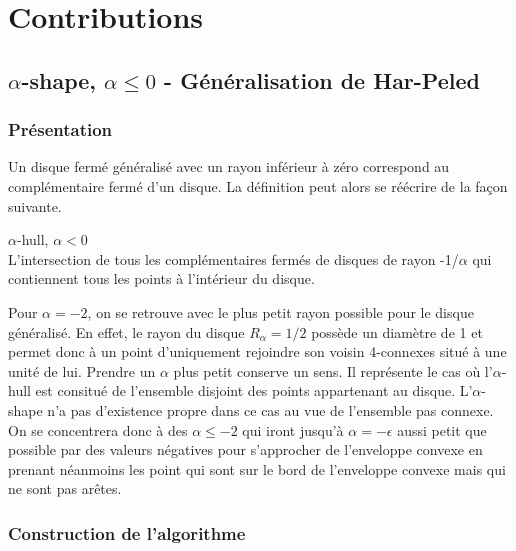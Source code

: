 \section{Contributions}

\subsection{$\alpha$-shape, $\alpha \leq 0$ - Généralisation de Har-Peled}

\subsubsection{Présentation}

Un disque fermé généralisé avec un rayon inférieur à zéro correspond au complémentaire fermé d'un disque. La définition peut alors se réécrire de la façon suivante.
\begin{Definition}{$\alpha$-hull, $\alpha < 0$}\\
\label{def:nas}
    L'intersection de tous les complémentaires fermés de disques de rayon -1/$\alpha$ qui contiennent tous les points à l’intérieur du disque.
\end{Definition}

Pour $\alpha = -2$, on se retrouve avec le plus petit rayon possible pour le disque généralisé. En effet, le rayon du disque $R_{\alpha} = 1/2$ possède un diamètre de 1 et permet donc à un point d'uniquement rejoindre son voisin 4-connexes situé à une unité de lui. Prendre un $\alpha$ plus petit conserve un sens. Il représente le cas où l'$\alpha$-hull est consitué de l'ensemble disjoint des points appartenant au disque. L'$\alpha$-shape n'a pas d'existence propre dans ce cas au vue de l'ensemble pas connexe. On se concentrera donc à des $\alpha \leq -2$ qui iront jusqu'à $\alpha = -\epsilon$ aussi petit que possible par des valeurs négatives pour s'approcher de l'enveloppe convexe en prenant néanmoins les point qui sont sur le bord de l'enveloppe convexe mais qui ne sont pas arêtes.


\subsubsection{Construction de l'algorithme}

